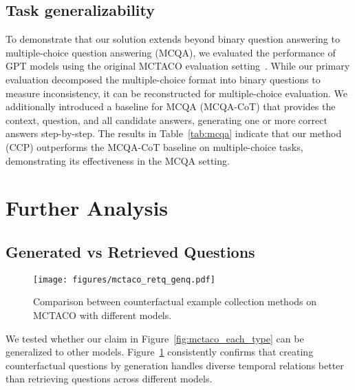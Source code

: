 \subsection{Task generalizability}
To demonstrate that our solution extends beyond binary question answering to multiple-choice question answering (MCQA), we evaluated the performance of GPT models using the original MCTACO evaluation setting~\cite{zhou2019going}. While our primary evaluation decomposed the multiple-choice format into binary questions to measure inconsistency, it can be reconstructed for multiple-choice evaluation. We additionally introduced a baseline for MCQA (MCQA-CoT) that provides the context, question, and all candidate answers, generating one or more correct answers step-by-step. 
The results in Table~\ref{tab:mcqa} indicate that our method (CCP) outperforms the MCQA-CoT baseline on multiple-choice tasks, demonstrating its effectiveness in the MCQA setting.


\section{Further Analysis}

\subsection{Generated vs Retrieved Questions}

% 
\begin{figure}[h]
    \centering
    \texttt{[image: figures/mctaco\_retq\_genq.pdf]}
    \vspace{-8mm}
    \caption{Comparison between counterfactual example collection methods on MCTACO with different models.}
    \label{fig:mctaco_retq_genq}
    \vspace{-3mm}
\end{figure}

We tested whether our claim in Figure~\ref{fig:mctaco_each_type} can be generalized to other models. Figure~\ref{fig:mctaco_retq_genq} consistently confirms that creating counterfactual questions by generation handles diverse temporal relations better than retrieving questions across different models.



